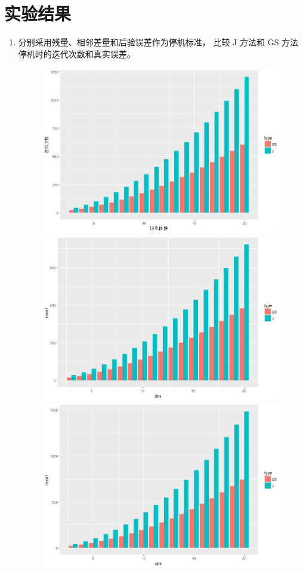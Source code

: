 \documentclass[10pt]{article}
\begin{document}
  \part{实验结果}
  \begin{enumerate}
  \item 分别采用残量、相邻差量和后验误差作为停机标准， 比较 J 方法和 GS 方法停机时的迭代次数和真实误差。
  \begin{figure}[H]
  \centering
  \includegraphics[width=.9\textwidth]{1-1.png}
  \includegraphics[width=.9\textwidth]{1-2.png}
  \includegraphics[width=.9\textwidth]{1-3.png}

\end{figure}
\end{enumerate}
\end{document}

